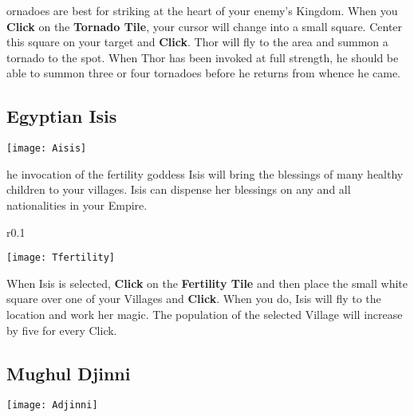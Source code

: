 ornadoes are best for striking at the heart of your enemy’s Kingdom. When you \textbf{Click} on the \textbf{Tornado Tile}, your cursor will change into a small square. Center this square on your target and \textbf{Click}. Thor will fly to the area and summon a tornado to the spot. When Thor has been invoked at full strength, he should be able to summon three or four tornadoes before he returns from whence he came.

\clearpage

\subsection{Egyptian Isis}


\begin{center}
    \texttt{[image: Aisis]}
\end{center}

he invocation of the fertility goddess Isis will bring the blessings of many healthy children to your villages. Isis can dispense her blessings on any and all nationalities in your Empire.

\begin{wrapfigure}{r}{0.1\textwidth}
    \vspace{-20pt}
    \begin{center}
        \texttt{[image: Tfertility]}
    \end{center}
    \vspace{-20pt}
\end{wrapfigure}


When Isis is selected, \textbf{Click} on the \textbf{Fertility Tile} and then place the small white square over one of your Villages and \textbf{Click}. When you do, Isis will fly to the location and work her magic. The population of the selected Village will increase by five for every Click.

\subsection{Mughul Djinni}


\begin{center}
    \texttt{[image: Adjinni]}
\end{center}

